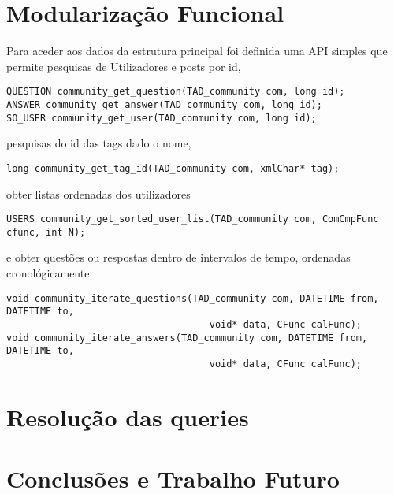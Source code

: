 \documentclass[10pt,a4paper]{report}
\begin{document}
\chapter{Modularização Funcional}
    Para aceder aos dados da estrutura principal foi definida uma API
    simples que permite pesquisas de Utilizadores e posts por id,
    \begin{verbatim}
QUESTION community_get_question(TAD_community com, long id);
ANSWER community_get_answer(TAD_community com, long id);
SO_USER community_get_user(TAD_community com, long id);
    \end{verbatim}
    pesquisas do id das tags dado o nome,
    \begin{verbatim}
long community_get_tag_id(TAD_community com, xmlChar* tag);
    \end{verbatim}
    obter listas ordenadas dos utilizadores
    \begin{verbatim}
USERS community_get_sorted_user_list(TAD_community com, ComCmpFunc cfunc, int N);
    \end{verbatim}
    e obter questões ou respostas dentro de intervalos de tempo,
    ordenadas cronológicamente.
    \begin{verbatim}
void community_iterate_questions(TAD_community com, DATETIME from, DATETIME to,
                                    void* data, CFunc calFunc);
void community_iterate_answers(TAD_community com, DATETIME from, DATETIME to,
                                    void* data, CFunc calFunc);
    \end{verbatim}

\chapter{Resolução das queries}
    
\chapter{Conclusões e Trabalho Futuro}
\end{document}
